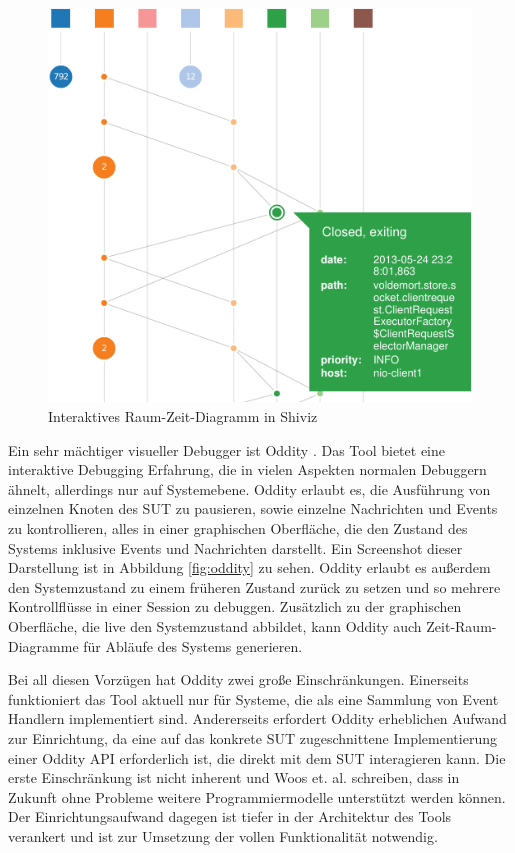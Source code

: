 \documentclass[12pt,a4paper]{report}
\begin{document}
\begin{figure}[H]
	\centering
	\includegraphics[width=\linewidth]{img/shiviz_time_space.pdf}
    \caption{Interaktives Raum-Zeit-Diagramm in Shiviz \cite{ShiViz_visual_debugger}}
	\label{fig:shiviz}
\end{figure}

Ein sehr mächtiger visueller Debugger ist Oddity \cite{oddity_graphical_debugger}. Das Tool bietet eine interaktive Debugging
Erfahrung, die in vielen Aspekten normalen Debuggern ähnelt, allerdings nur auf Systemebene. Oddity erlaubt es, die Ausführung von
einzelnen Knoten des SUT zu pausieren, sowie einzelne Nachrichten und Events zu kontrollieren, alles in einer graphischen
Oberfläche, die den Zustand des Systems inklusive Events und Nachrichten darstellt. Ein Screenshot dieser Darstellung ist in
Abbildung \ref{fig:oddity} zu sehen. Oddity erlaubt es außerdem den Systemzustand zu einem früheren Zustand zurück zu setzen und
so mehrere Kontrollflüsse in einer Session zu debuggen. Zusätzlich zu der graphischen Oberfläche, die live den Systemzustand
abbildet, kann Oddity auch Zeit-Raum-Diagramme für Abläufe des Systems generieren.

Bei all diesen Vorzügen hat Oddity zwei große Einschränkungen. Einerseits funktioniert das Tool aktuell nur für Systeme, die als
eine Sammlung von Event Handlern implementiert sind. Andererseits erfordert Oddity erheblichen Aufwand zur Einrichtung, da eine
auf das konkrete SUT zugeschnittene Implementierung einer Oddity API erforderlich ist, die direkt mit dem SUT interagieren kann.
Die erste Einschränkung ist nicht inherent und Woos et. al. \cite{oddity_graphical_debugger} schreiben, dass in Zukunft ohne Probleme weitere
Programmiermodelle unterstützt werden können. Der Einrichtungsaufwand dagegen ist tiefer in der Architektur des Tools verankert und
ist zur Umsetzung der vollen Funktionalität notwendig.
\end{document}
